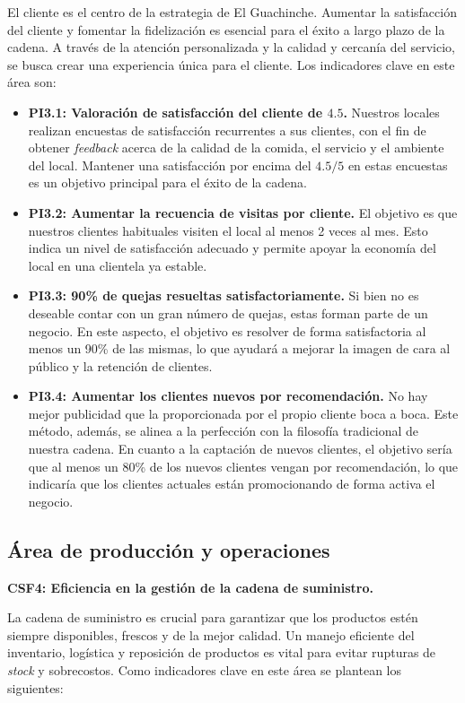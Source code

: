 \documentclass[12pt]{opticajnl}
\begin{document}
El cliente es el centro de la estrategia de El Guachinche. Aumentar la satisfacción del cliente y fomentar la fidelización es esencial para el éxito a largo plazo de la cadena. A través de la atención personalizada y la calidad y cercanía del servicio, se busca crear una experiencia única para el cliente. Los indicadores clave en este área son:

\begin{itemize}
    \item \textbf{PI3.1: Valoración de satisfacción del cliente de $4.5$.} Nuestros locales realizan encuestas de satisfacción recurrentes a sus clientes, con el fin de obtener \textit{feedback} acerca de la calidad de la comida, el servicio y el ambiente del local. Mantener una satisfacción por encima del $4.5/5$ en estas encuestas es un objetivo principal para el éxito de la cadena.
    \item \textbf{PI3.2: Aumentar la recuencia de visitas por cliente.} El objetivo es que nuestros clientes habituales visiten el local al menos 2 veces al mes. Esto indica un nivel de satisfacción adecuado y permite apoyar la economía del local en una clientela ya estable.
    \item \textbf{PI3.3: 90\% de quejas resueltas satisfactoriamente.} Si bien no es deseable contar con un gran número de quejas, estas forman parte de un negocio. En este aspecto, el objetivo es resolver de forma satisfactoria al menos un 90\% de las mismas, lo que ayudará a mejorar la imagen de cara al público y la retención de clientes.
    \item \textbf{PI3.4: Aumentar los clientes nuevos por recomendación.} No hay mejor publicidad que la proporcionada por el propio cliente boca a boca. Este método, además, se alinea a la perfección con la filosofía tradicional de nuestra cadena. En cuanto a la captación de nuevos clientes, el objetivo sería que al menos un 80\% de los nuevos clientes vengan por recomendación, lo que indicaría que los clientes actuales están promocionando de forma activa el negocio.
\end{itemize}

\subsection{Área de producción y operaciones}

\textbf{CSF4: Eficiencia en la gestión de la cadena de suministro.}

La cadena de suministro es crucial para garantizar que los productos estén siempre disponibles, frescos y de la mejor calidad. Un manejo eficiente del inventario, logística y reposición de productos es vital para evitar rupturas de \textit{stock} y sobrecostos. Como indicadores clave en este área se plantean los siguientes:
\end{document}
